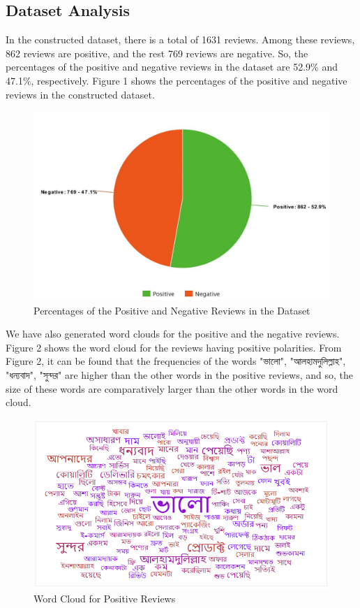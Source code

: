 \documentclass[conference]{IEEEtran}
\begin{document}
\subsection{Dataset Analysis}
In the constructed dataset, there is a total of 1631 reviews. Among these reviews, 862 reviews are positive, and the rest 769 reviews are negative. So, the percentages of the positive and negative reviews in the dataset are 52.9\% and 47.1\%, respectively. Figure 1 shows the percentages of the positive and negative reviews in the constructed dataset.
\begin{figure}[htbp]
  \centering
\includegraphics[width=\columnwidth,height=\textheight,keepaspectratio]{dataset.jpeg}
  \caption{Percentages of the Positive and Negative Reviews in the Dataset}
  \label{fig:scope1}
\end{figure}
\vspace{0.5cm}

We have also generated word clouds for the positive and the negative reviews. Figure 2 shows the word cloud for the reviews having positive polarities. From Figure 2, it can be found that the frequencies of the words \bn "ভালো", "আলহামদুলিল্লাহ", "ধন্যবাদ", "সুন্দর" are higher than the other words in the positive reviews, and so, the size of these words are comparatively larger than the other words in the word cloud.

\begin{figure}[htbp]
  \centering
\includegraphics[width=\columnwidth,height=\textheight,keepaspectratio]{snipvaloPNG.PNG}
  \caption{Word Cloud for Positive Reviews}
  \label{fig:scope1}
\end{figure}
\end{document}
